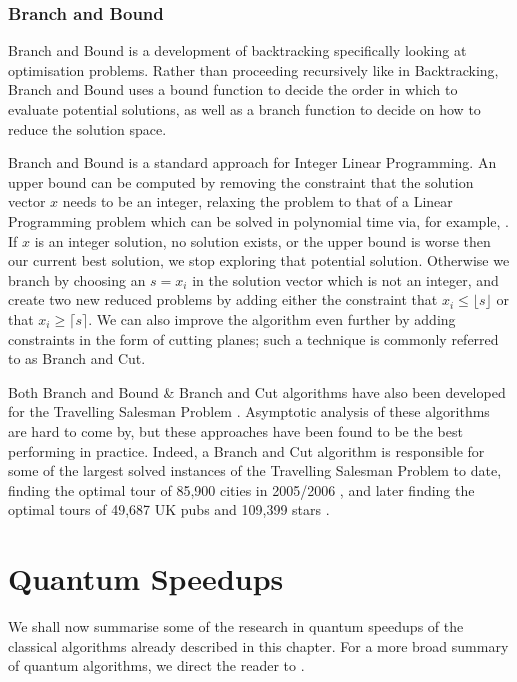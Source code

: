 \subsubsection{Branch and Bound}

Branch and Bound is a development of backtracking specifically looking at optimisation problems. Rather than proceeding recursively like in Backtracking, Branch and Bound uses a bound function to decide the order in which to evaluate potential solutions, as well as a branch function to decide on how to reduce the solution space.

Branch and Bound is a standard approach for Integer Linear Programming. An upper bound can be computed by removing the constraint that the solution vector $x$ needs to be an integer, relaxing the problem to that of a Linear Programming problem which can be solved in polynomial time via, for example, \cite{cohen2019}. If $x$ is an integer solution, no solution exists, or the upper bound is worse then our current best solution, we stop exploring that potential solution. Otherwise we branch by choosing an $s = x_i$ in the solution vector which is not an integer, and create two new reduced problems by adding either the constraint that $x_i \leq \lfloor s \rfloor$ or that $x_i \geq \lceil s \rceil$. We can also improve the algorithm even further by adding constraints in the form of cutting planes; such a technique is commonly referred to as Branch and Cut.

Both Branch and Bound \& Branch and Cut algorithms have also been developed for the Travelling Salesman Problem \cite{little1963, padberg1991}. Asymptotic analysis of these algorithms are hard to come by, but these approaches have been found to be the best performing in practice. Indeed, a Branch and Cut algorithm is responsible for some of the largest solved instances of the Travelling Salesman Problem to date, finding the optimal tour of 85,900 cities in 2005/2006 \cite{applegate2006}, and later finding the optimal tours of 49,687 UK pubs and 109,399 stars \cite{tspuk49687}.

\section{Quantum Speedups}
\label{sec:quantum-np}

We shall now summarise some of the research in quantum speedups of the classical algorithms already described in this chapter. For a more broad summary of quantum algorithms, we direct the reader to \cite{montanaro2016}.


